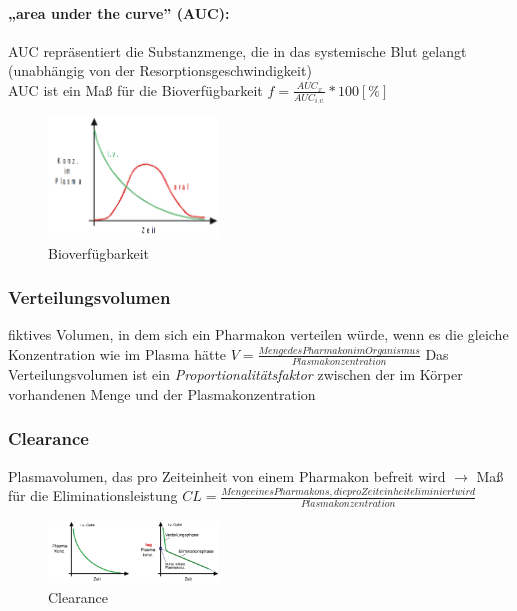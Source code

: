 \documentclass[10pt,a4paper]{report}
\begin{document}
\paragraph{„area under the curve” (AUC):}
AUC repräsentiert die Substanzmenge, 
die in das systemische Blut gelangt 
(unabhängig von der Resorptionsgeschwindigkeit)\\
AUC ist ein Maß für die Bioverfügbarkeit  $f=\frac{AUC_x}{AUC_{i.v.}}*100[\%]$
\begin{figure}[h]
	\centering 
	\includegraphics[width=0.4\textwidth]{konzentrationzeit.png} 
	\caption{Bioverfügbarkeit} 
	\label{fig:Bioverfuegbarkeit}
\end{figure}
\subsubsection{Verteilungsvolumen}
 fiktives Volumen, in dem sich ein Pharmakon verteilen würde, wenn es die gleiche Konzentration wie im Plasma hätte $V=\frac{Menge des Pharmakon im Organismus}{Plasmakonzentration}$ Das Verteilungsvolumen ist ein \textit{Proportionalitätsfaktor} zwischen der im Körper vorhandenen Menge und der Plasmakonzentration
 \subsubsection{Clearance}
 Plasmavolumen, das pro Zeiteinheit von einem Pharmakon befreit wird  $\rightarrow$ Maß für die Eliminationsleistung $CL=\frac{Menge eines Pharmakons, die pro Zeiteinheit eliminiert wird}{Plasmakonzentration}$
\begin{figure}[h]
	\centering 
	\includegraphics[width=0.4\textwidth]{clearance.png} 
	\caption{Clearance} 
	\label{fig:Clearance}
\end{figure}
\end{document}

